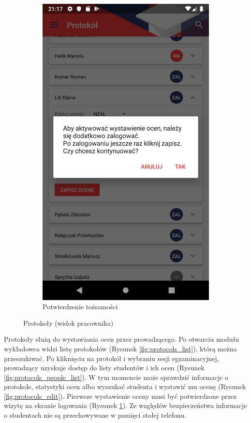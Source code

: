 \documentclass{pracamgr}
\begin{document}
\begin{figure}[p]
\begin{subfigure}[t]{0.3\textwidth}
		\includegraphics[width=\textwidth]{img/protocols_access.png}
		\caption{Potwierdzenie tożsamości}
		\label{fig:protocols_access}
	\end{subfigure}
	\caption{Protokoły (widok pracownika)}\label{fig:protocols}
	\medskip
\end{figure}

Protokoły służą do wystawiania ocen przez prowadzącego. Po otwarciu modułu wykładowca
widzi listę protokołów (Rysunek \ref{fig:protocols_list}), którą można przeszukiwać. Po kliknięciu na protokół i wybraniu
sesji egzaminacyjnej, prowadzący uzyskuje dostęp do listy studentów i ich ocen (Rysunek \ref{fig:protocols_people_list}). W tym
momencie może sprawdzić informacje o protokole, statystyki ocen albo wyszukać
studenta i wystawić mu ocenę (Rysunek \ref{fig:protocols_edit}). Pierwsze wystawienie oceny musi być potwierdzone przez
wizytę na ekranie logowania (Rysunek \ref{fig:protocols_access}). Ze względów bezpieczeństwa informacje o studentach nie
są przechowywane w pamięci stałej telefonu.
\end{document}
